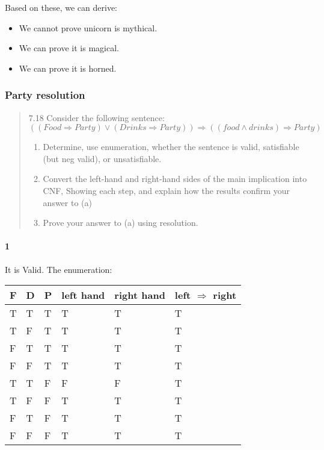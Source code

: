 Based on these, we can derive:
\begin{itemize}
\item We cannot prove unicorn is mythical.
\item We can prove it is magical.
\item We can prove it is horned.
\end{itemize}

\subsubsection{Party resolution}
\begin{quote}
  7.18 Consider the following sentence:
  $$
  ((Food \Rightarrow Party) \vee (Drinks \Rightarrow Party))
  \Rightarrow ((food \wedge drinks) \Rightarrow Party)
  $$
  \begin{enumerate}
  \item Determine, use enumeration, whether the sentence is
    valid, satisfiable (but neg valid), or unsatisfiable.
  \item Convert the left-hand and right-hand sides of the main
    implication into CNF, Showing each step, and explain how the
    results confirm your answer to (a)
  \item Prove your answer to (a) using resolution.
  \end{enumerate}
\end{quote}

\paragraph{1}
It is Valid.
The enumeration:

\begin{tabular}{l|l|l|l|l|l}
  F & D & P & left hand & right hand & left $\Rightarrow$ right\\
  \hline
  T & T & T & T         & T          & T\\
  T & F & T & T         & T          & T\\
  F & T & T & T         & T          & T\\
  F & F & T & T         & T          & T\\
  \hline
  T & T & F & F         & F          & T\\
  T & F & F & T         & T          & T\\
  F & T & F & T         & T          & T\\
  F & F & F & T         & T          & T
\end{tabular}

